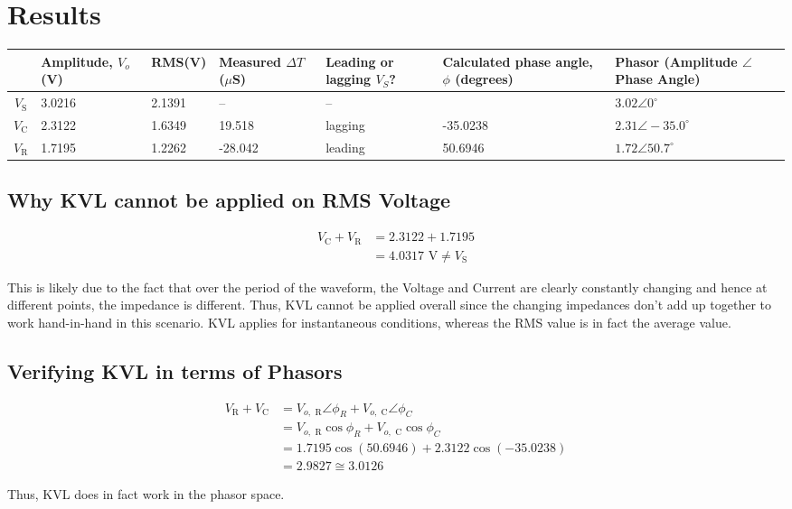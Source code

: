 \documentclass[a4paper,12pt,oneside, tikz]{book}
\begin{document}
\section{Results}
\begin{table}
    \centering
    \begin{tabular}[H]{|c|P{2cm}|P{1.5cm}|P{2cm}|P{2cm}|P{3cm}|P{3cm}|}
        \hline & Amplitude, $V_o$ (V) & RMS\newline (V) & Measured $\Delta T$ ($\mu$S) & Leading or lagging $V_S$? & Calculated phase angle, $\phi$ (degrees) & Phasor (Amplitude $\angle$ Phase Angle) \\
        \hline $V_\text{S}$ & 3.0216 & 2.1391 & -- & -- & & $3.02\angle 0^\circ{}$ \\
        \hline $V_\text{C}$ & 2.3122 & 1.6349 & 19.518 & lagging & -35.0238 & $2.31\angle -35.0^{\circ}$ \\
        \hline $V_\text{R}$ & 1.7195 & 1.2262 & -28.042 & leading & 50.6946 & $1.72\angle 50.7^{\circ}$ \\
        \hline
    \end{tabular}
\end{table}

\subsection{Why KVL cannot be applied on RMS Voltage}
\begin{tcolorbox}
\begin{align*}
    V_\text{C} + V_\text{R} &= 2.3122 + 1.7195 \\
    &= 4.0317\text{ V} \neq V_\text{S}
\end{align*}

This is likely due to the fact that over the period of the waveform, the Voltage and Current are clearly constantly changing and hence at different points, the impedance is different. Thus, KVL cannot be applied overall since the changing impedances don't add up together to work hand-in-hand in this scenario. KVL applies for instantaneous conditions, whereas the RMS value is in fact the average value.
\end{tcolorbox}

\subsection{Verifying KVL in terms of Phasors}
\begin{tcolorbox}
    \begin{align*}
        V_\text{R} + V_\text{C} &= V_{o, \text{ R}} \angle \phi_R + V_{o, \text{ C}} \angle \phi_C \\
        &= V_{o, \text{ R}} \cos \phi_R  + V_{o, \text{ C}} \cos \phi_C \\
        &= 1.7195 \cos(50.6946) + 2.3122\cos(-35.0238) \\
        &= 2.9827 \cong 3.0126
    \end{align*}

    Thus, KVL does in fact work in the phasor space.
\end{tcolorbox}
\end{document}
